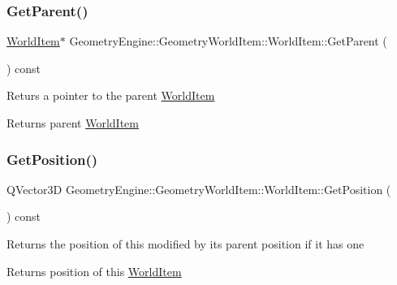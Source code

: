 \subsubsection{\texorpdfstring{GetParent()}{GetParent()}}
{\footnotesize\ttfamily \mbox{\hyperlink{class_geometry_engine_1_1_geometry_world_item_1_1_world_item}{World\+Item}}$\ast$ Geometry\+Engine\+::\+Geometry\+World\+Item\+::\+World\+Item\+::\+Get\+Parent (\begin{DoxyParamCaption}{ }\end{DoxyParamCaption}) const\hspace{0.3cm}{\ttfamily [inline]}}

Returs a pointer to the parent \mbox{\hyperlink{class_geometry_engine_1_1_geometry_world_item_1_1_world_item}{World\+Item}} \begin{DoxyReturn}{Returns}
parent \mbox{\hyperlink{class_geometry_engine_1_1_geometry_world_item_1_1_world_item}{World\+Item}} 
\end{DoxyReturn}
\mbox{\label{class_geometry_engine_1_1_geometry_world_item_1_1_world_item_a363a9b807eee91c99264ba1fc9b0e83b}} 
\subsubsection{\texorpdfstring{GetPosition()}{GetPosition()}}
{\footnotesize\ttfamily Q\+Vector3D Geometry\+Engine\+::\+Geometry\+World\+Item\+::\+World\+Item\+::\+Get\+Position (\begin{DoxyParamCaption}{ }\end{DoxyParamCaption}) const}

Returns the position of this modified by its parent position if it has one \begin{DoxyReturn}{Returns}
position of this \mbox{\hyperlink{class_geometry_engine_1_1_geometry_world_item_1_1_world_item}{World\+Item}} 
\end{DoxyReturn}
\mbox{\label{class_geometry_engine_1_1_geometry_world_item_1_1_world_item_a34a387b75a951afaf8d73007a59bdf07}} 
